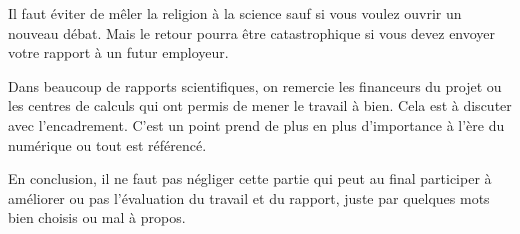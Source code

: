 Il faut éviter de mêler la religion à la science sauf si vous voulez ouvrir un nouveau débat. Mais le retour pourra être catastrophique si vous
devez envoyer votre rapport à un futur employeur.

Dans beaucoup de rapports scientifiques, on remercie les financeurs du projet ou les centres de calculs qui ont permis de mener le travail à bien.
Cela est à discuter avec l'encadrement.
C'est un point prend de plus en plus d'importance à l'ère du numérique ou tout est référencé.

En conclusion, il ne faut pas négliger cette partie qui peut au final participer à améliorer ou pas l'évaluation du travail et du rapport, juste par quelques mots
bien choisis ou mal à propos.